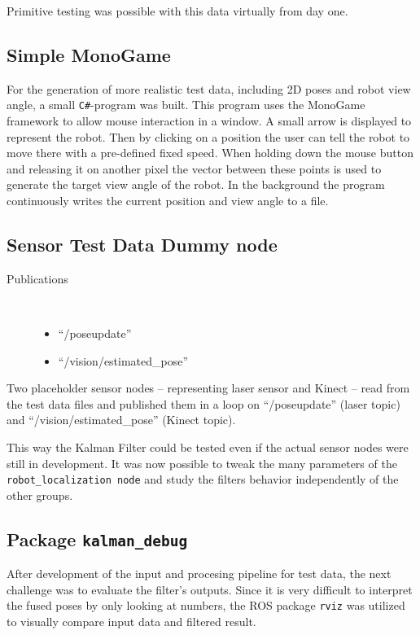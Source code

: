 Primitive testing was possible with this data virtually from day one.

\subsection{Simple MonoGame}
For the generation of more realistic test data, including 2D poses and robot view angle, a small \texttt{C\#}-program was built. This program uses the MonoGame framework to allow mouse interaction in a window. A small arrow is displayed to represent the robot. Then by clicking on a position the user can tell the robot to move there with a pre-defined fixed speed. When holding down the mouse button and releasing it on another pixel the vector between these points is used to generate the target view angle of the robot. In the background the program continuously writes the current position and view angle to a file.

\subsection{Sensor Test Data Dummy node}
\begin{description}
\item[Publications]\
	\begin{itemize}
	\item ``/poseupdate''
	\item ``/vision/estimated\_pose''
	\end{itemize}
\end{description}

Two placeholder sensor nodes -- representing laser sensor and Kinect -- read from the test data files and published them in a loop on ``/poseupdate'' (laser topic) and ``/vision/estimated\_pose'' (Kinect topic).

This way the Kalman Filter could be tested even if the actual sensor nodes were still in development. It was now possible to tweak the many parameters of the \texttt{robot\_localization node} and study the filters behavior independently of the other groups.

\subsection{Package \texttt{kalman\_debug}}
After development of the input and procesing pipeline for test data, the next challenge was to evaluate the filter's outputs. Since it is very difficult to interpret the fused poses by only looking at numbers, the ROS package \texttt{rviz} was utilized to visually compare input data and filtered result.

